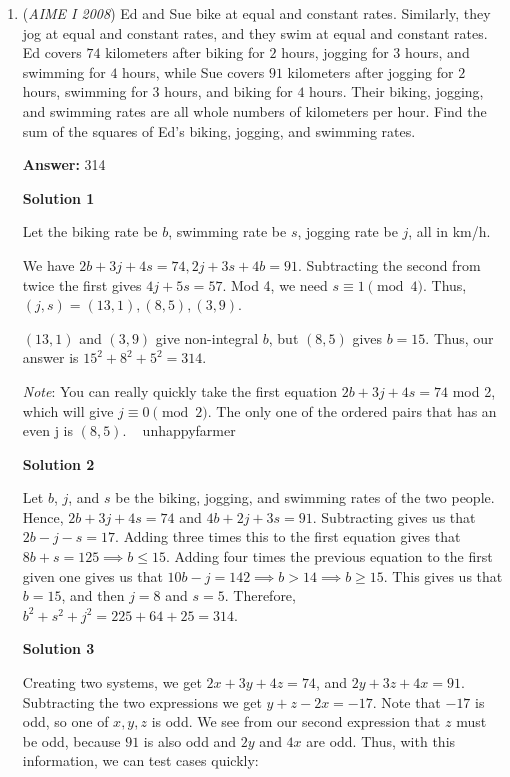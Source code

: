 \begin{enumerate}
 


	\item (\textit{AIME I 2008}) Ed and Sue bike at equal and constant rates.  Similarly, they jog at equal and constant rates, and they swim at equal and constant rates.  Ed covers $74$ kilometers after biking for $2$ hours, jogging for $3$ hours, and swimming for $4$ hours, while Sue covers $91$ kilometers after jogging for $2$ hours, swimming for $3$ hours, and biking for $4$ hours.  Their biking, jogging, and swimming rates are all whole numbers of kilometers per hour.  Find the sum of the squares of Ed's biking, jogging, and swimming rates.


 
 \textbf{Answer: }314



\textbf{Solution 1}

Let the biking rate be $b$, swimming rate be $s$, jogging rate be $j$, all in km/h.

 We have $2b + 3j + 4s = 74,2j + 3s + 4b = 91$. Subtracting the second from twice the first gives $4j + 5s = 57$. Mod 4, we need $s\equiv1\pmod{4}$. Thus, $(j,s) = (13,1),(8,5),(3,9)$.

 $(13,1)$ and $(3,9)$ give non-integral $b$, but $(8,5)$ gives $b = 15$. Thus, our answer is $15^{2} + 8^{2} + 5^{2} = \boxed{314}$.

 \textit{Note}: You can really quickly take the first equation $2b + 3j + 4s = 74$ mod 2, which will give $j \equiv 0 \pmod{2}$. The only one of the ordered pairs that has an even j is $(8,5)$. ~ unhappyfarmer

 



\textbf{Solution 2}

Let $b$, $j$, and $s$ be the biking, jogging, and swimming rates of the two people.  Hence, $2b + 3j + 4s = 74$ and $4b + 2j + 3s = 91$.  Subtracting gives us that $2b - j - s = 17$.  Adding three times this to the first equation gives that $8b + s = 125\implies b\le 15$.  Adding four times the previous equation to the first given one gives us that $10b - j = 142\implies b > 14\implies b\ge 15$.  This gives us that $b = 15$, and then $j = 8$ and $s = 5$.  Therefore, $b^2 + s^2 + j^2 = 225 + 64 + 25 = \boxed{314}$.

 



\textbf{Solution 3}

Creating two systems, we get $2x+3y+4z=74$, and $2y+3z+4x=91$. Subtracting the two expressions we get $y+z-2x=-17$. Note that $-17$ is odd, so one of $x,y,z$ is odd. We see from our second expression that $z$ must be odd, because $91$ is also odd and $2y$ and $4x$ are odd. Thus, with this information, we can test cases quickly:


\end{enumerate}
